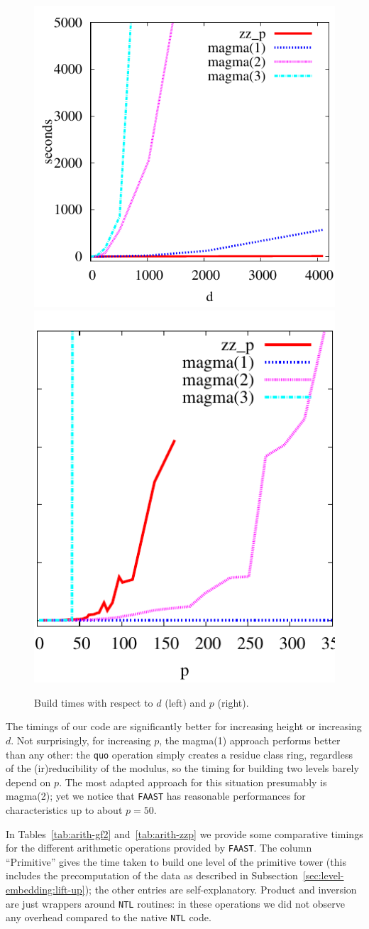 \begin{figure}
  \centering
  \includegraphics[height=0.5\textwidth]{artin/build-d}
  \includegraphics[height=0.5\textwidth]{artin/build-p}
  
  \caption{Build times with respect to $d$ (left) and $p$ (right).}
  \label{fig:p-d}
\end{figure}

The timings of our code are significantly better for increasing height
or increasing $d$. Not surprisingly, for increasing $p$, the magma(1)
approach performs better than any other: the \texttt{quo} operation
simply creates a residue class ring, regardless of the
(ir)reducibility of the modulus, so the timing for building two levels
barely depend on $p$. The most adapted approach for this situation
presumably is magma(2); yet we notice that \texttt{FAAST} has
reasonable performances for characteristics up to about $p=50$.

In Tables~\ref{tab:arith-gf2} and~\ref{tab:arith-zzp} we provide some
comparative timings for the different arithmetic operations provided
by \texttt{FAAST}. The column ``Primitive'' gives the time taken to
build one level of the primitive tower (this includes the
precomputation of the data as described in
Subsection~\ref{sec:level-embedding:lift-up}); the other entries are
self-explanatory. Product and inversion are just wrappers around
\texttt{NTL} routines: in these operations we did not observe any
overhead compared to the native \texttt{NTL} code. 

